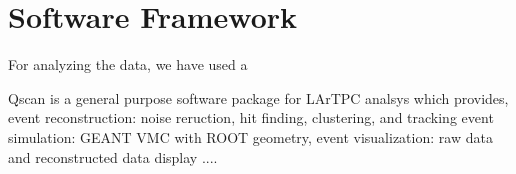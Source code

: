 \section{Software Framework}
For analyzing the data, we have used a 

Qscan is a general purpose software package for LArTPC analsys
which provides,
event reconstruction:  noise reruction, hit finding, clustering, and tracking
event simulation: GEANT VMC with ROOT geometry, 
event visualization: raw data and reconstructed data display
....
